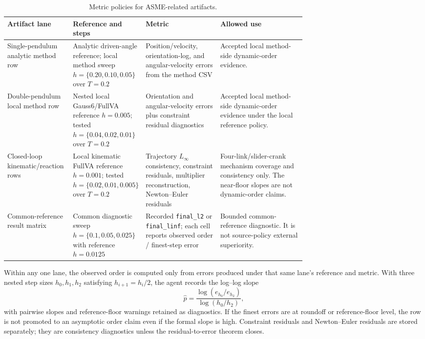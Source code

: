 \documentclass[10pt]{article}
\newcommand{\method}{Gauss6/FullVA}
\begin{document}
\begin{table}[H]
\centering
\caption{Metric policies for ASME-related artifacts.}
\label{tab:metric_policies}
\small
\begin{tabularx}{\linewidth}{p{0.22\linewidth}p{0.24\linewidth}p{0.25\linewidth}Y}
\toprule
\textbf{Artifact lane} & \textbf{Reference and steps} & \textbf{Metric} & \textbf{Allowed use} \\
\midrule
Single-pendulum analytic method row & Analytic driven-angle reference; local method sweep $h=\{0.20,0.10,0.05\}$ over $T=0.2$ & Position/velocity, orientation-log, and angular-velocity errors from the method CSV & Accepted local method-side dynamic-order evidence. \\
Double-pendulum local method row & Nested local \method{} reference $h=0.005$; tested $h=\{0.04,0.02,0.01\}$ over $T=0.2$ & Orientation and angular-velocity errors plus constraint residual diagnostics & Accepted local method-side dynamic-order evidence under the local reference policy. \\
Closed-loop kinematic/reaction rows & Local kinematic FullVA reference $h=0.001$; tested $h=\{0.02,0.01,0.005\}$ over $T=0.2$ & Trajectory $L_\infty$ consistency, constraint residuals, multiplier reconstruction, Newton--Euler residuals & Four-link/slider-crank mechanism coverage and consistency only. The near-floor slopes are not dynamic-order claims. \\
Common-reference result matrix & Common diagnostic sweep $h=\{0.1,0.05,0.025\}$ with reference $h=0.0125$ & Recorded \texttt{final\_l2} or \texttt{final\_linf}; each cell reports observed order / finest-step error & Bounded common-reference diagnostic. It is not source-policy external superiority. \\
\bottomrule
\end{tabularx}
\end{table}

Within any one lane, the observed order is computed only from errors produced
under that same lane's reference and metric. With three nested step sizes
$h_0,h_1,h_2$ satisfying $h_{i+1}=h_i/2$, the agent records the log--log slope
\[
  \widehat p
  =
  \frac{\log(e_{h_0}/e_{h_2})}{\log(h_0/h_2)} ,
\]
with pairwise slopes and reference-floor warnings retained as diagnostics.
If the finest errors are at roundoff or reference-floor level, the row is not
promoted to an asymptotic order claim even if the formal slope is high.
Constraint residuals and Newton--Euler residuals are stored separately; they
are consistency diagnostics unless the residual-to-error theorem closes.
\end{document}
